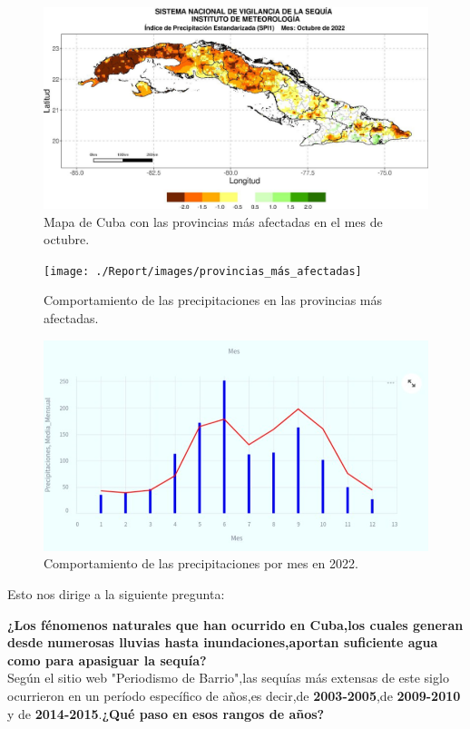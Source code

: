 \documentclass[12pt]{article}
\begin{document}
\begin{figure}[H]
	\centering
	\includegraphics[width=0.8\linewidth]{./Report/images/mapa_octubre_ismet}
	\caption{Mapa de Cuba con las provincias más afectadas en el mes de octubre.}
	\label{fig:mapaoctubreismet}
\end{figure}

\begin{figure}[H]
	\centering
	\texttt{[image: ./Report/images/provincias\_más\_afectadas]}
	\caption{Comportamiento de las precipitaciones en las provincias más afectadas.}
	\label{fig:provinciasmasafectadas}
\end{figure}



\begin{figure}[H]
	\centering
	\includegraphics[width=0.8\linewidth]{./Report/images/precipitaciones_2022}
	\caption{Comportamiento de las precipitaciones por mes en 2022.}
	\label{fig:precipitaciones2022}
\end{figure}


\newpage
Esto nos dirige a la siguiente pregunta:

\textbf{¿Los fénomenos naturales que han ocurrido en Cuba,los cuales generan desde numerosas lluvias hasta inundaciones,aportan suficiente agua como para apasiguar la sequía?}\\


Según el sitio web "Periodismo de Barrio",las sequías más extensas de este siglo ocurrieron en un período específico de años,es decir,de \textbf{2003-2005},de \textbf{2009-2010} y de \textbf{2014-2015}.\textbf{¿Qué paso en esos rangos de años?}\cite{webpage3}
\end{document}

